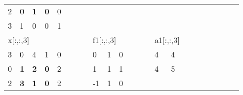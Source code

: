 \begin{table}[h]
\begin{tabular}{lllllllllllllllllllllll}
\multicolumn{1}{|l|}{2} & \multicolumn{1}{l|}{\textbf{0}} & \multicolumn{1}{l|}{\textbf{1}} & \multicolumn{1}{l|}{\textbf{0}} & \multicolumn{1}{l|}{0} &  &  &                       &                         &                         &                         &  &  &                       &                         &                        &  &  &                       &                        &                         &  &  \\ \cline{1-5}
\multicolumn{1}{|l|}{3} & \multicolumn{1}{l|}{1}          & \multicolumn{1}{l|}{0}          & \multicolumn{1}{l|}{0}          & \multicolumn{1}{l|}{1} &  &  &                       &                         &                         &                         &  &  &                       &                         &                        &  &  &                       &                        &                         &  &  \\ \cline{1-5}
\multicolumn{5}{l}{x{[}:,:,3{]}}                                                                                                                       &  &  &                       & \multicolumn{3}{l}{f1{[}:,:,3{]}}                                           &  &  &                       & \multicolumn{2}{l}{a1{[}:,:,3{]}}                &  &  &                       &                        &                         &  &  \\ \cline{1-5} \cline{9-11} \cline{15-16}
\multicolumn{1}{|l|}{3} & \multicolumn{1}{l|}{0}          & \multicolumn{1}{l|}{4}          & \multicolumn{1}{l|}{1}          & \multicolumn{1}{l|}{0} &  &  & \multicolumn{1}{l|}{} & \multicolumn{1}{l|}{0}  & \multicolumn{1}{l|}{1}  & \multicolumn{1}{l|}{0}  &  &  & \multicolumn{1}{l|}{} & \multicolumn{1}{l|}{4}  & \multicolumn{1}{l|}{4} &  &  &                       &                        &                         &  &  \\ \cline{1-5} \cline{9-11} \cline{15-16}
\multicolumn{1}{|l|}{0} & \multicolumn{1}{l|}{\textbf{1}} & \multicolumn{1}{l|}{\textbf{2}} & \multicolumn{1}{l|}{\textbf{0}} & \multicolumn{1}{l|}{2} &  &  & \multicolumn{1}{l|}{} & \multicolumn{1}{l|}{1}  & \multicolumn{1}{l|}{1}  & \multicolumn{1}{l|}{1}  &  &  & \multicolumn{1}{l|}{} & \multicolumn{1}{l|}{4}  & \multicolumn{1}{l|}{5} &  &  &                       &                        &                         &  &  \\ \cline{1-5} \cline{9-11} \cline{15-16}
\multicolumn{1}{|l|}{2} & \multicolumn{1}{l|}{\textbf{3}} & \multicolumn{1}{l|}{\textbf{1}} & \multicolumn{1}{l|}{\textbf{0}} & \multicolumn{1}{l|}{2} &  &  & \multicolumn{1}{l|}{} & \multicolumn{1}{l|}{-1} & \multicolumn{1}{l|}{1}  & \multicolumn{1}{l|}{0}  &  &  &                       &                         &                        &  &  &                       &                        &                         &  &  \\ \cline{1-5} \cline{9-11}

\end{tabular}
\end{table}
